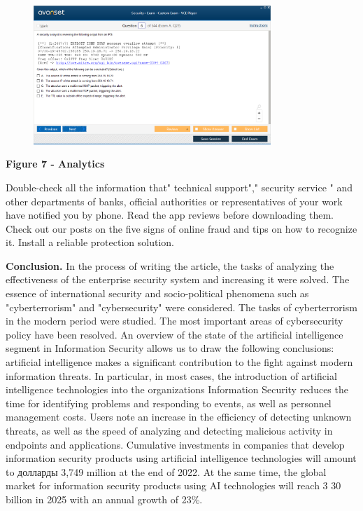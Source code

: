 \begin{figure}[H]
	\centering
	\includegraphics[width=0.8\textwidth]{assets/69}
	\caption*{}
\end{figure}

\textbf{Figure 7 - Analytics}

Double-check all the information that" technical support"," security
service " and other departments of banks, official authorities or
representatives of your work have notified you by phone. Read the app
reviews before downloading them. Check out our posts on the five signs
of online fraud and tips on how to recognize it. Install a reliable
protection solution.

\textbf{Conclusion.} In the process of writing the article, the tasks of
analyzing the effectiveness of the enterprise security system and
increasing it were solved. The essence of international security and
socio-political phenomena such as "cyberterrorism" and "cybersecurity"
were considered. The tasks of cyberterrorism in the modern period were
studied. The most important areas of cybersecurity policy have been
resolved. An overview of the state of the artificial intelligence
segment in Information Security allows us to draw the following
conclusions: artificial intelligence makes a significant contribution to
the fight against modern information threats. In particular, in most
cases, the introduction of artificial intelligence technologies into the
organization\textquotesingle s Information Security reduces the time for
identifying problems and responding to events, as well as personnel
management costs. Users note an increase in the efficiency of detecting
unknown threats, as well as the speed of analyzing and detecting
malicious activity in endpoints and applications. Cumulative investments
in companies that develop information security products using artificial
intelligence technologies will amount to долларды 3,749 million at the
end of 2022. At the same time, the global market for information
security products using AI technologies will reach 3 30 billion in 2025
with an annual growth of 23\%.

